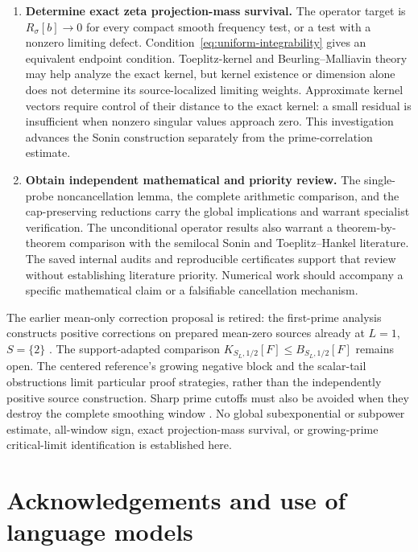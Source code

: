 \documentclass[11pt]{article}
\numberwithin{equation}{section}
\theoremstyle{definition}
\theoremstyle{remark}
\begin{document}
\begin{enumerate}[label=\arabic*.,leftmargin=*]
\item \textbf{Determine exact zeta projection-mass survival.}
The operator target is \(R_\sigma[b]\to0\) for every compact smooth
frequency test, or a test with a nonzero limiting defect.
Condition~\eqref{eq:uniform-integrability} gives an equivalent endpoint
condition. Toeplitz-kernel and Beurling--Malliavin theory
\cite{MPInner,MPBM} may help analyze the exact kernel, but kernel
existence or dimension alone does not determine its source-localized
limiting weights. Approximate kernel vectors require control of their
distance to the exact kernel: a small residual is insufficient when
nonzero singular values approach zero. This investigation advances the
Sonin construction separately from the prime-correlation estimate.

\item \textbf{Obtain independent mathematical and priority review.}
The single-probe noncancellation lemma, the complete arithmetic
comparison, and the cap-preserving reductions carry the global
implications and warrant specialist verification. The unconditional
operator results also warrant a theorem-by-theorem comparison with
the semilocal Sonin and Toeplitz--Hankel literature. The saved internal
audits and reproducible certificates support that review without
establishing literature priority. Numerical work should accompany a
specific mathematical claim or a falsifiable cancellation mechanism.
\end{enumerate}

The earlier mean-only correction proposal is retired: the first-prime
analysis constructs positive corrections on prepared mean-zero sources
already at \(L=1\), \(S=\{2\}\) \cite{FirstPrimeResonance}.
The support-adapted comparison \(K_{S_L,1/2}[F]\le B_{S_L,1/2}[F]\)
remains open. The centered reference's growing negative block and the
scalar-tail obstructions limit particular proof strategies, rather than
the independently positive source construction. Sharp prime cutoffs
must also be avoided when they destroy the complete smoothing window
\cite{GlobalGrowthNotes}. No global subexponential or subpower estimate,
all-window sign, exact projection-mass survival, or growing-prime
critical-limit identification is established here.

\section*{Acknowledgements and use of language models}
\end{document}
